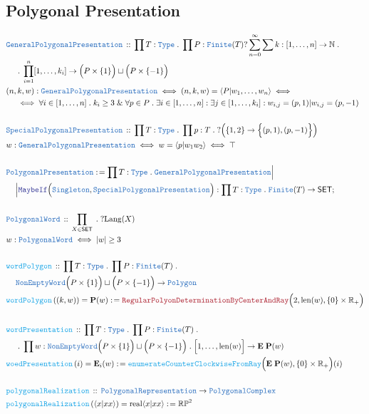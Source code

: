 \documentclass[12pt]{scrartcl}
\newcommand{\TYPE}[1]{\textcolor{NavyBlue}{\mathtt{#1}}}
\newcommand{\FUNC}[1]{\textcolor{Cerulean}{\mathtt{#1}}}
\newcommand{\LOGIC}[1]{\textcolor{Blue}{\mathtt{#1}}}
\newcommand{\THM}[1]{\textcolor{Maroon}{\mathtt{#1}}}
\renewcommand{\.}{\; . \;}
\newcommand{\de}{: \kern 0.1pc =}
\newcommand{\Act}[1]{\left( #1 \right)}
\newcommand{\DeclareType}[2]{& \TYPE{#1} \, :: \, #2 \\}
\newcommand{\DefineType}[3]{& #1 : \TYPE{#2} \iff #3 \\}
\newcommand{\DefineNamedType}[4]{& #1 : \TYPE{#2} \iff #3 \iff #4 \\}
\newcommand{\DeclareFunc}[2]{& \FUNC{#1} \, :: \, #2 \\}
\newcommand{\DefineNamedFunc}[4]{&  \FUNC{#1}\Act{#2} = #3 \de #4 \\}
\newcommand{\NewLine}{\\ & \kern 1pc}
\newcommand{\Page}[1]{ \begin{align*} #1 \end{align*}   }
\renewcommand{\And}{\; \& \;}
\newcommand{\Type}{\TYPE{Type}}
\newcommand{\Reals}{\mathbb{R} }
\newcommand{\Nat}{\mathbb{N} }
\newcommand{\Conclude}[3]{& #1 \de #2 : #3; \\}
\newcommand{\SET}{\mathsf{SET}}
\begin{document}
\subsection{Polygonal Presentation}
\Page{
	\DeclareType{GeneralPolygonalPresentation}
	{
		\prod T : \Type \.
		\prod P : \TYPE{Finite}(T)
		?\sum^\infty_{n=0} 
		\sum k : [1,\ldots,n] \to \Nat \. \NewLine \. 
		\prod^n_{i=1} [1,\ldots,k_i] \to \Big(P \times \{1\}\Big) \sqcup \Big(P \times \{-1\} \Big) 
	}
	\DefineNamedType{(n,k,w)}{GeneralPolygonalPresentation}
	{
		(n,k,w) = \langle P | w_1, \ldots, w_n \rangle
	}
	{
		\NewLine \iff
		\forall i \in [1,\ldots,n] \. k_i \ge 3
		\And 
		\forall p \in P \.
		\exists i \in [1,\ldots,n] :
		\exists j \in [1,\ldots,k_i] :
		w_{i,j} = (p,1) | w_{i,j} = (p,-1)
	}
	\\
	\DeclareType{SpecialPolygonalPresentation}
	{
		\prod T : \Type \.
		\prod p : T \.
		?\Big(\{1,2\} \to \Big\{ (p,1), (p,-1) \Big\}\Big)
	}
	\DefineNamedType{w}{GeneralPolygonalPresentation}
	{
		w = \langle p | w_1w_2 \rangle
	}
	{
		\top
	}
	\\
	\Conclude{\TYPE{PolygonalPresentation}}{
		\prod T : \Type \. 
		\TYPE{GeneralPolygonalPresentation}\Big| 
		\NewLine \Big|
		\LOGIC{MaybeIf}\Big(\TYPE{Singleton},\TYPE{SpecialPolygonalPresentation}\Big) }
	{
		\prod T  : \Type \. \TYPE{Finite}(T) \to \SET
	}
	\\
	\DeclareType{PolygonalWord}{\prod_{ X \in \SET} \. ?\mathrm{Lang}(X) }
	\DefineType{w}{PolygonalWord}{|w| \ge 3}
	\\
	\DeclareFunc{wordPolygon}
	{
		\prod T : \Type \.
		\prod P : \TYPE{Finite}(T) \. \NewLine
		\TYPE{NonEmptyWord}\Big(P \times \{1\}\Big) \sqcup \Big(P \times \{-1\} \Big) \to \TYPE{Polygon}
	}
	\DefineNamedFunc{wordPolygon}{(k,w)}{\mathbf{P}(w)}
	{\THM{RegularPolyonDeterminationByCenterAndRay}\Big( 2,\mathrm{len}(w), \{0\} \times \Reals_+ \Big)}
	\\
	\DeclareFunc{wordPresentation}
	{
		\prod T : \Type \.
		\prod P : \TYPE{Finite}(T) \. \NewLine \. 
		\prod w : \TYPE{NonEmptyWord}\Big(P \times \{1\}\Big) \sqcup \Big(P \times \{-1\} \Big)  \.
		\Big[1, \ldots,\mathrm{len}(w)\Big] \to \mathbf{E\; P}(w)
	}
	\DefineNamedFunc{woedPresentation}{i}{\mathbf{E}_i(w)}
	{\FUNC{enumerateCounterClockwiseFromRay}\Big( \mathbf{E \; P}(w), \{0\} \times \Reals_+ \Big)(i)}
	\\
	\DeclareFunc{polygonalRealization}
	{
		\TYPE{PolygonalRepresentation} \to \TYPE{PolygonalComplex}
	}
	\DefineNamedFunc{polygonalRealization}{\langle x | xx \rangle}
	{ \mathrm{real} \langle x | xx \rangle }{\mathbb{RP}^2}
}
\end{document}
